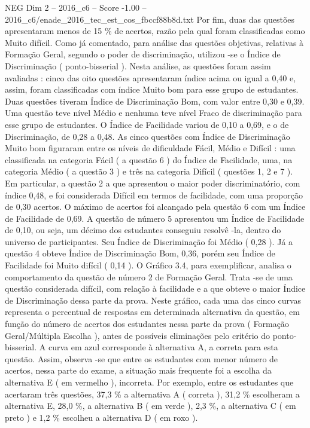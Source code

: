 \begin{textsample}{NEG Dim 2 – 2016\_c6 – Score -1.00 – 2016\_c6/enade\_2016\_tec\_est\_cos\_fbccf88b8d.txt}
Por fim, duas das questões apresentaram menos de 15 \% de acertos, razão pela qual foram classificadas como Muito difícil.
Como já comentado, para análise das questões objetivas, relativas à Formação Geral, segundo o poder de discriminação, utilizou -se o Índice de Discriminação ( ponto-bisserial ).
Nesta análise, as questões foram assim avaliadas : cinco das oito questões apresentaram índice acima ou igual a 0,40 e, assim, foram classificadas com índice Muito bom para esse grupo de estudantes.
Duas questões tiveram Índice de Discriminação Bom, com valor entre 0,30 e 0,39.
Uma questão teve nível Médio e nenhuma teve nível Fraco de discriminação para esse grupo de estudantes.
O Índice de Facilidade variou de 0,10 a 0,69, e o de Discriminação, de 0,28 a 0,48.
As cinco questões com Índice de Discriminação Muito bom figuraram entre os níveis de dificuldade Fácil, Médio e Difícil : uma classificada na categoria Fácil ( a questão 6 ) do Índice de Facilidade, uma, na categoria Médio ( a questão 3 ) e três na categoria Difícil ( questões 1, 2 e 7 ).
Em particular, a questão 2 a que apresentou o maior poder discriminatório, com índice 0,48, e foi considerada Difícil em termos de facilidade, com uma proporção de 0,30 acertos.
O máximo de acertos foi alcançado pela questão 6 com um Índice de Facilidade de 0,69.
A questão de número 5 apresentou um Índice de Facilidade de 0,10, ou seja, um décimo dos estudantes conseguiu resolvê -la, dentro do universo de participantes.
Seu Índice de Discriminação foi Médio ( 0,28 ).
Já a questão 4 obteve Índice de Discriminação Bom, 0,36, porém seu Índice de Facilidade foi Muito difícil ( 0,14 ).
O Gráfico 3.4, para exemplificar, analisa o comportamento da questão de número 2 de Formação Geral.
Trata -se de uma questão considerada difícil, com relação à facilidade e a que obteve o maior Índice de Discriminação dessa parte da prova.
Neste gráfico, cada uma das cinco curvas representa o percentual de respostas em determinada alternativa da questão, em função do número de acertos dos estudantes nessa parte da prova ( Formação Geral/Múltipla Escolha ), antes de possíveis eliminações pelo critério do ponto-bisserial.
A curva em azul corresponde à alternativa A, a correta para esta questão.
Assim, observa -se que entre os estudantes com menor número de acertos, nessa parte do exame, a situação mais frequente foi a escolha da alternativa E ( em vermelho ), incorreta.
Por exemplo, entre os estudantes que acertaram três questões, 37,3 \% a alternativa A ( correta ), 31,2 \% escolheram a alternativa E, 28,0 \%, a alternativa B ( em verde ), 2,3 \%, a alternativa C ( em preto ) e 1,2 \% escolheu a alternativa D ( em roxo ).

\end{textsample}
